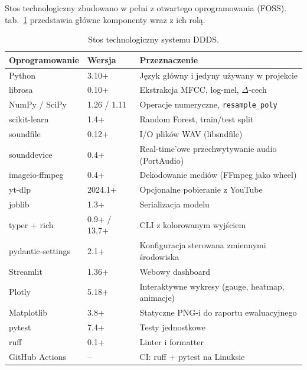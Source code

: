 \documentclass[11pt,a4paper]{article}
\newcommand{\tabref}[1]{tab.~\ref{#1}}
\begin{document}
Stos technologiczny zbudowano w pełni z otwartego oprogramowania (FOSS).
\tabref{tab:software} przedstawia główne komponenty wraz z ich rolą.

\begin{table}[H]
\centering
\caption{Stos technologiczny systemu DDDS.}
\label{tab:software}
\begin{tabularx}{\linewidth}{llX}
\toprule
\textbf{Oprogramowanie} & \textbf{Wersja} & \textbf{Przeznaczenie} \\
\midrule
Python                & 3.10+      & Język główny i jedyny używany w projekcie \\
librosa \cite{librosa} & 0.10+     & Ekstrakcja MFCC, log-mel, $\Delta$-cech \\
NumPy / SciPy         & 1.26 / 1.11 & Operacje numeryczne, \texttt{resample\_poly} \\
scikit-learn \cite{sklearn} & 1.4+ & Random Forest, train/test split \\
soundfile             & 0.12+      & I/O plików WAV (libsndfile) \\
sounddevice           & 0.4+       & Real-time'owe przechwytywanie audio (PortAudio) \\
imageio-ffmpeg        & 0.4+       & Dekodowanie mediów (FFmpeg jako wheel) \\
yt-dlp                & 2024.1+    & Opcjonalne pobieranie z YouTube \\
joblib                & 1.3+       & Serializacja modelu \\
typer + rich          & 0.9+ / 13.7+ & CLI z kolorowanym wyjściem \\
pydantic-settings     & 2.1+       & Konfiguracja sterowana zmiennymi środowiska \\
Streamlit \cite{streamlit} & 1.36+ & Webowy dashboard \\
Plotly \cite{plotly}  & 5.18+      & Interaktywne wykresy (gauge, heatmap, animacje) \\
Matplotlib            & 3.8+       & Statyczne PNG-i do raportu ewaluacyjnego \\
pytest                & 7.4+       & Testy jednostkowe \\
ruff                  & 0.1+       & Linter i formatter \\
GitHub Actions        & --         & CI: ruff + pytest na Linuksie \\
\bottomrule
\end{tabularx}
\end{table}
\end{document}
